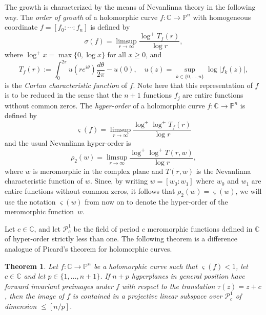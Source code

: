 \documentclass{amsart}
\newcommand{\C}{\mathbb{C}}
\renewcommand{\P}{\mathbb{P}}
\newtheorem{theorem}{Theorem}%
\theoremstyle{definition}
\numberwithin{equation}{section}
\numberwithin{theorem}{section}
\begin{document}
The growth is characterized by the means of Nevanlinna theory in the following way. The \textit{order of growth} of a holomorphic curve $f:\C\to\P^n$
with homogeneous coordinate $f=[f_0:\cdots:f_n]$ is defined by
    \begin{equation}\label{order}
    \sigma(f)=\limsup_{r\to\infty}\frac{\log^+ T_f(r)}{\log r},
    \end{equation}
where $\log^+x=\max\{0,\log x\}$ for all $x\ge0$, and
    \begin{equation}\label{characteristic}
    T_f(r):=\int_0^{2\pi}u(re^{i\theta})\frac{d\theta}{2\pi}-u(0),
    \quad u(z)=\sup_{k\in \{0,\ldots,n\}} \log|f_k(z)|,
    \end{equation}
is the \textit{Cartan characteristic function} of $f$. Note here
that this representation of $f$ is to be reduced in the sense that
the $n+1$ functions $f_j$ are entire functions without common
zeros. The \textit{hyper-order} of a holomorphic curve $f:\C\to\P^n$ is defined by
    \begin{equation}\label{horder}
    \varsigma(f)=\limsup_{r\to\infty}\frac{\log^+\log^+ T_f(r)}{\log
    r}
    \end{equation}
and the usual Nevanlinna hyper-order is
    \begin{equation*}
    \rho_2(w)=\limsup_{r\to\infty}\frac{\log^+\log^+T(r,w)}{\log r},
    \end{equation*}
where $w$ is meromorphic in the complex plane and $T(r,w)$ is the Nevanlinna characteristic function of $w$. Since, by writing $w=[w_0:w_1]$ where $w_0$ and $w_1$ are entire functions without common zeros, it follows that $\rho_2(w)=\varsigma(w)$, we will use the notation $\varsigma(w)$ from now on to denote the hyper-order of the meromorphic function~$w$.

Let $c\in\C$, and let $\mathcal{P}^1_c$ be the field of period $c$ meromorphic functions
defined in $\C$ of hyper-order strictly less than one. The following theorem is a difference analogue of Picard's theorem for holomorphic curves.

\begin{theorem}\label{hypers}
Let $f:\C\to\P^n$ be a holomorphic curve such that
$\varsigma(f)<1$, let $c\in\C$ and let $p\in\{1,\ldots,n+1\}$. If $n+p$ hyperplanes in general position have forward invariant preimages under $f$ with respect to the translation
$\tau(z)= z+c$, then the image of $f$ is contained in a projective
linear subspace over $\mathcal{P}^1_c$ of dimension $\leq[n/p]$.
\end{theorem}
\end{document}

